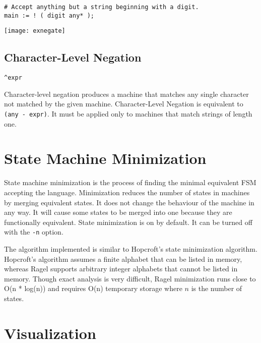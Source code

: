 \documentclass[letterpaper,11pt,oneside]{book}
\newcommand{\verbspace}{\vspace{10pt}}
\newcommand{\graphspace}{\vspace{10pt}}
\newenvironment{inline_code}{\def\baselinestretch{1}\vspace{12pt}\small}{}
\begin{document}
\begin{inline_code}
\begin{verbatim}
# Accept anything but a string beginning with a digit.
main := ! ( digit any* );
\end{verbatim}
\end{inline_code}
\verbspace
% }%%
% END GENERATE

\graphspace
\begin{center}
\texttt{[image: exnegate]}
\end{center}
\graphspace

\subsection{Character-Level Negation}

\verb|^expr|

Character-level negation produces a machine that matches any single character
not matched by the given machine. Character-Level Negation is equivalent to
\verb|(any - expr)|. It must be applied only to machines that match strings of
length one.

\section{State Machine Minimization}

State machine minimization is the process of finding the minimal equivalent FSM accepting
the language. Minimization reduces the number of states in machines
by merging equivalent states. It does not change the behaviour of the machine
in any way. It will cause some states to be merged into one because they are
functionally equivalent. State minimization is on by default. It can be turned
off with the \verb|-n| option.

The algorithm implemented is similar to Hopcroft's state minimization
algorithm. Hopcroft's algorithm assumes a finite alphabet that can be listed in
memory, whereas Ragel supports arbitrary integer alphabets that cannot be
listed in memory. Though exact analysis is very difficult, Ragel minimization
runs close to O(n * log(n)) and requires O(n) temporary storage where
$n$ is the number of states.

\section{Visualization}
\label{visualization}
\end{document}

